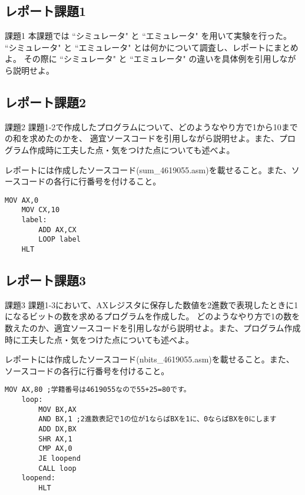 \documentclass[12pt]{jarticle}
\begin{document}
\subsection{レポート課題1}
\begin{itembox}[l]{課題1}
	本課題では ``シミュレータ" と ``エミュレータ" を用いて実験を行った。
	``シミュレータ" と ``エミュレータ" とは何かについて調査し、レポートにまとめよ。
	その際に ``シミュレータ" と ``エミュレータ" の違いを具体例を引用しながら説明せよ。
\end{itembox}

\subsection{レポート課題2}
\begin{itembox}[l]{課題2}
	課題1-2で作成したプログラムについて、どのようなやり方で1から10までの和を求めたのかを、
	適宜ソースコードを引用しながら説明せよ。また、プログラム作成時に工夫した点・気をつけた点についても述べよ。

	レポートには作成したソースコード(sum\_4619055.asm)を載せること。また、ソースコードの各行に行番号を付けること。
\end{itembox}

\begin{lstlisting}[caption=sum\_4619055.asm,label=sum]
	MOV AX,0
	MOV CX,10
	label:
		ADD AX,CX
		LOOP label
	HLT
\end{lstlisting}


\subsection{レポート課題3}
\begin{itembox}[l]{課題3}
	課題1-3において、AXレジスタに保存した数値を2進数で表現したときに1になるビットの数を求めるプログラムを作成した。
	どのようなやり方で1の数を数えたのか、適宜ソースコードを引用しながら説明せよ。また、プログラム作成時に工夫した点・気をつけた点についても述べよ。

	レポートには作成したソースコード(nbits\_4619055.asm)を載せること。また、ソースコードの各行に行番号を付けること。
\end{itembox}

\begin{lstlisting}[caption=nbits\_4619055.asm,label=nbits]
	MOV AX,80 ;学籍番号は4619055なので55+25=80です。
	loop:
		MOV BX,AX
		AND BX,1 ;2進数表記で1の位が1ならばBXを1に、0ならばBXを0にします
		ADD DX,BX
		SHR AX,1
		CMP AX,0
		JE loopend
		CALL loop
	loopend: 
		HLT
\end{lstlisting}
\end{document}
